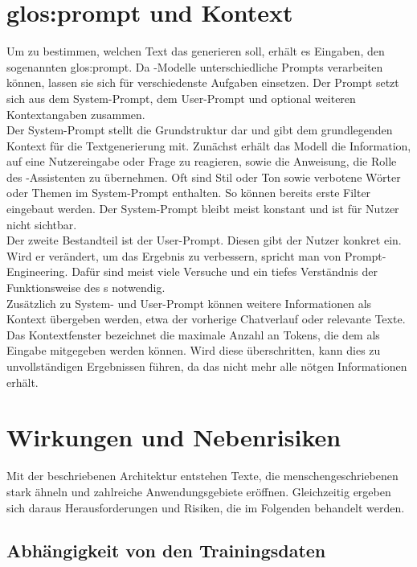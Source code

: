 \documentclass[../main.tex]{subfiles}
\begin{document}
\section{\gls{glos:prompt} und Kontext}

Um zu bestimmen, welchen Text das  generieren soll, erhält es Eingaben, den sogenannten \gls{glos:prompt}. Da -Modelle unterschiedliche Prompts 
verarbeiten können, lassen sie sich für verschiedenste Aufgaben einsetzen. Der Prompt setzt sich aus dem System-Prompt, dem User-Prompt und optional weiteren Kontextangaben zusammen.\cite{systemprompt}\\
Der System-Prompt stellt die Grundstruktur dar und gibt dem  grundlegenden Kontext für die Textgenerierung mit. Zunächst erhält das Modell die Information, auf eine 
Nutzereingabe oder Frage zu reagieren, sowie die Anweisung, die Rolle des -Assistenten zu übernehmen. Oft sind Stil oder Ton sowie verbotene Wörter oder Themen im System-Prompt 
enthalten. So können bereits erste Filter eingebaut werden.\cite{systemprompt} Der System-Prompt bleibt meist konstant und ist für Nutzer nicht sichtbar.\\
Der zweite Bestandteil ist der User-Prompt. Diesen gibt der Nutzer konkret ein. Wird er verändert, um das Ergebnis zu verbessern, spricht man von Prompt-Engineering. 
Dafür sind meist viele Versuche und ein tiefes Verständnis der Funktionsweise des s notwendig.\cite{promptengineering}\\
Zusätzlich zu System- und User-Prompt können weitere Informationen als Kontext übergeben werden, etwa der vorherige Chatverlauf oder relevante Texte. 
Das Kontextfenster bezeichnet die maximale Anzahl an Tokens, die dem  als Eingabe mitgegeben werden können. Wird diese überschritten, kann dies zu unvollständigen 
Ergebnissen führen, da das  nicht mehr alle nötgen Informationen erhält.

\section{Wirkungen und Nebenrisiken}
Mit der beschriebenen Architektur entstehen Texte, die menschengeschriebenen stark ähneln und zahlreiche Anwendungsgebiete eröffnen. Gleichzeitig ergeben sich daraus Herausforderungen und Risiken, 
die im Folgenden behandelt werden.

\subsection{Abhängigkeit von den Trainingsdaten}
\end{document}
